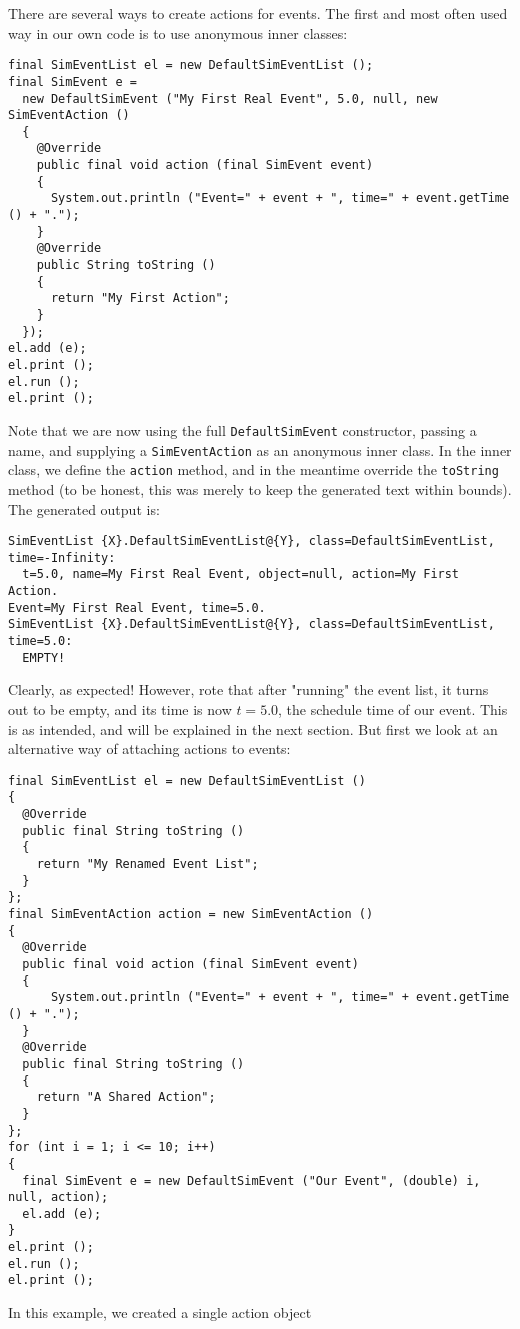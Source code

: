 There are several ways to create actions for events.
The first and most often used way in our own code is to use anonymous inner classes:
\begin{lstlisting}[basicstyle=\tiny]
final SimEventList el = new DefaultSimEventList ();
final SimEvent e =
  new DefaultSimEvent ("My First Real Event", 5.0, null, new SimEventAction ()
  {
    @Override
    public final void action (final SimEvent event)
    {
      System.out.println ("Event=" + event + ", time=" + event.getTime () + ".");
    }
    @Override
    public String toString ()
    {
      return "My First Action";
    }
  });
el.add (e);
el.print ();
el.run ();
el.print ();
\end{lstlisting}
Note that we are now using the full \lstinline{DefaultSimEvent} constructor,
  passing a name, and supplying a \lstinline{SimEventAction}
  as an anonymous inner class.
In the inner class, we define the \lstinline{action} method,
  and in the meantime override the \lstinline{toString} method
  (to be honest, this was merely to keep the generated text within bounds).
The generated output is:
\begin{lstlisting}[basicstyle=\tiny]
SimEventList {X}.DefaultSimEventList@{Y}, class=DefaultSimEventList, time=-Infinity:
  t=5.0, name=My First Real Event, object=null, action=My First Action.
Event=My First Real Event, time=5.0.
SimEventList {X}.DefaultSimEventList@{Y}, class=DefaultSimEventList, time=5.0:
  EMPTY!
\end{lstlisting}
Clearly, as expected!
However, rote that after "running" the event list, it turns out to be empty,
  and its time is now $t=5.0$, the schedule time of our event.
This is as intended, and will be explained in the next section.
But first we look at an alternative way of attaching
  actions to events:
\begin{lstlisting}[basicstyle=\tiny]
final SimEventList el = new DefaultSimEventList ()
{
  @Override
  public final String toString ()
  {
    return "My Renamed Event List";
  } 
};
final SimEventAction action = new SimEventAction ()
{
  @Override
  public final void action (final SimEvent event)
  {
      System.out.println ("Event=" + event + ", time=" + event.getTime () + ".");
  }
  @Override
  public final String toString ()
  {
    return "A Shared Action";
  }
};
for (int i = 1; i <= 10; i++)
{
  final SimEvent e = new DefaultSimEvent ("Our Event", (double) i, null, action);
  el.add (e);
}
el.print ();
el.run ();
el.print ();
\end{lstlisting}
In this example, we created a single action object
